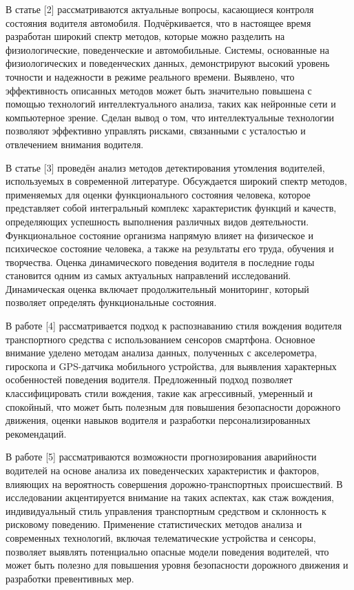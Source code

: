 В статье {[}2{]} рассматриваются актуальные вопросы, касающиеся контроля
состояния водителя автомобиля. Подчёркивается, что в настоящее время
разработан широкий спектр методов, которые можно разделить на
физиологические, поведенческие и автомобильные. Системы, основанные на
физиологических и поведенческих данных, демонстрируют высокий уровень
точности и надежности в режиме реального времени. Выявлено, что
эффективность описанных методов может быть значительно повышена с
помощью технологий интеллектуального анализа, таких как нейронные сети и
компьютерное зрение. Сделан вывод о том, что интеллектуальные технологии
позволяют эффективно управлять рисками, связанными с усталостью и
отвлечением внимания водителя.

В статье {[}3{]} проведён анализ методов детектирования утомления
водителей, используемых в современной литературе. Обсуждается широкий
спектр методов, применяемых для оценки функционального состояния
человека, которое представляет собой интегральный комплекс характеристик
функций и качеств, определяющих успешность выполнения различных видов
деятельности. Функциональное состояние организма напрямую влияет на
физическое и психическое состояние человека, а также на результаты его
труда, обучения и творчества. Оценка динамического поведения водителя в
последние годы становится одним из самых актуальных направлений
исследований. Динамическая оценка включает продолжительный мониторинг,
который позволяет определять функциональные состояния.

В работе {[}4{]} рассматривается подход к распознаванию стиля вождения
водителя транспортного средства с использованием сенсоров смартфона.
Основное внимание уделено методам анализа данных, полученных с
акселерометра, гироскопа и GPS-датчика мобильного устройства, для
выявления характерных особенностей поведения водителя. Предложенный
подход позволяет классифицировать стили вождения, такие как агрессивный,
умеренный и спокойный, что может быть полезным для повышения
безопасности дорожного движения, оценки навыков водителя и разработки
персонализированных рекомендаций.

В работе {[}5{]} рассматриваются возможности прогнозирования аварийности
водителей на основе анализа их поведенческих характеристик и факторов,
влияющих на вероятность совершения дорожно-транспортных происшествий. В
исследовании акцентируется внимание на таких аспектах, как стаж
вождения, индивидуальный стиль управления транспортным средством и
склонность к рисковому поведению. Применение статистических методов
анализа и современных технологий, включая телематические устройства и
сенсоры, позволяет выявлять потенциально опасные модели поведения
водителей, что может быть полезно для повышения уровня безопасности
дорожного движения и разработки превентивных мер.

